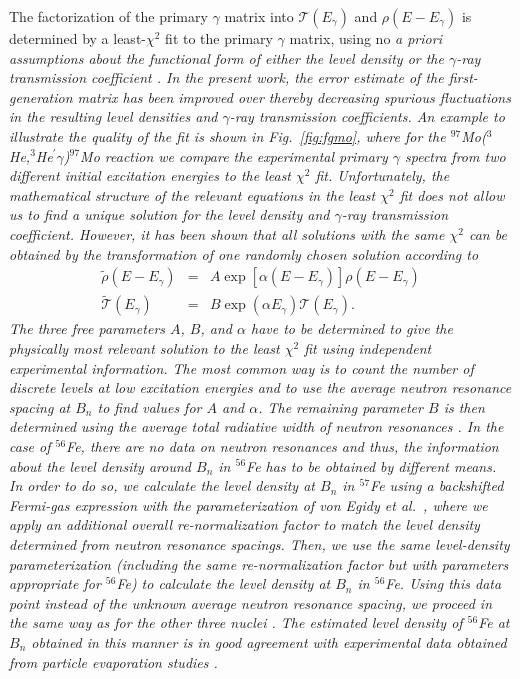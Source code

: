 \begin{multicols}{2}
The factorization of the primary $\gamma$ matrix into ${\mathcal{T}}(E_\gamma)$
and $\rho(E-E_\gamma)$ is determined by a least-$\chi^2$ fit to the primary 
$\gamma$ matrix, using no \sl a priori \rm assumptions about the functional 
form of either the level density or the $\gamma$-ray transmission coefficient 
\cite{SB00}. In the present work, the error estimate of the first-generation 
matrix has been improved over \cite{SB00} thereby decreasing spurious 
fluctuations in the resulting level densities and $\gamma$-ray transmission 
coefficients. An example to illustrate the quality of the fit is shown in Fig.\
\ref{fig:fgmo}, where for the $^{97}$Mo($^3$He,$^3$He$^\prime\gamma$)$^{97}$Mo 
reaction we compare the experimental primary $\gamma$ spectra from two 
different initial excitation energies to the least $\chi^2$ fit. Unfortunately,
the mathematical structure of the relevant equations in the least $\chi^2$ fit 
does not allow us to find a unique solution for the level density and 
$\gamma$-ray transmission coefficient. However, it has been shown that all 
solutions with the same $\chi^2$ can be obtained by the transformation of one 
randomly chosen solution according to \cite{SB00}
\begin{eqnarray}
\tilde{\rho}(E-E_\gamma)&=&A\exp[\alpha(E-E_\gamma)]\rho(E-E_\gamma)\\
\tilde{\mathcal{T}}(E_\gamma)&=&B\exp(\alpha E_\gamma){\mathcal{T}}(E_\gamma).
\end{eqnarray}
The three free parameters $A$, $B$, and $\alpha$ have to be determined to give 
the physically most relevant solution to the least $\chi^2$ fit using 
independent experimental information. The most common way is to count the 
number of discrete levels at low excitation energies \cite{FS96} and to use the
average neutron resonance spacing at $B_n$ to find values for $A$ and $\alpha$.
The remaining parameter $B$ is then determined using the average total 
radiative width of neutron resonances \cite{VG01}. In the case of $^{56}$Fe, 
there are no data on neutron resonances and thus, the information about the 
level density around $B_n$ in $^{56}$Fe has to be obtained by different means. 
In order to do so, we calculate the level density at $B_n$ in $^{57}$Fe using a
backshifted Fermi-gas expression with the parameterization of von Egidy \sl et 
al.\ \rm \cite{ES88}, where we apply an additional overall re-normalization 
factor to match the level density determined from neutron resonance spacings. 
Then, we use the same level-density parameterization (including the same 
re-normalization factor but with parameters appropriate for $^{56}$Fe) to 
calculate the level density at $B_n$ in $^{56}$Fe. Using this data point 
instead of the unknown average neutron resonance spacing, we proceed in the 
same way as for the other three nuclei \cite{SB00,Ta02}. The estimated level 
density of $^{56}$Fe at $B_n$ obtained in this manner is in good agreement with
experimental data obtained from particle evaporation studies \cite{FT84}.


\end{multicols}

